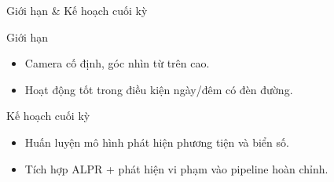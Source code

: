 \begin{frame}{Giới hạn \& Kế hoạch cuối kỳ}
    \begin{block}{Giới hạn}
        \begin{itemize}
            \item Camera cố định, góc nhìn từ trên cao.
            \item Hoạt động tốt trong điều kiện ngày/đêm có đèn đường.
        \end{itemize}
    \end{block}

    \begin{block}{Kế hoạch cuối kỳ}
        \begin{itemize}
            \item Huấn luyện mô hình phát hiện phương tiện và biển số.
            \item Tích hợp ALPR + phát hiện vi phạm vào pipeline hoàn chỉnh.
        \end{itemize}
    \end{block}
\end{frame}
